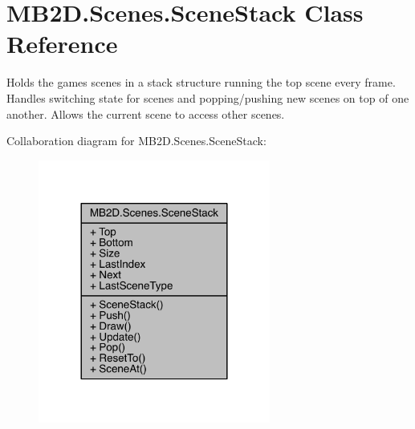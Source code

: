 \hypertarget{class_m_b2_d_1_1_scenes_1_1_scene_stack}{}\section{M\+B2\+D.\+Scenes.\+Scene\+Stack Class Reference}
\label{class_m_b2_d_1_1_scenes_1_1_scene_stack}


Holds the games scenes in a stack structure running the top scene every frame. Handles switching state for scenes and popping/pushing new scenes on top of one another. Allows the current scene to access other scenes.  




Collaboration diagram for M\+B2\+D.\+Scenes.\+Scene\+Stack\+:
\nopagebreak
\begin{figure}[H]
\begin{center}
\leavevmode
\includegraphics[width=216pt]{class_m_b2_d_1_1_scenes_1_1_scene_stack__coll__graph}
\end{center}
\end{figure}

